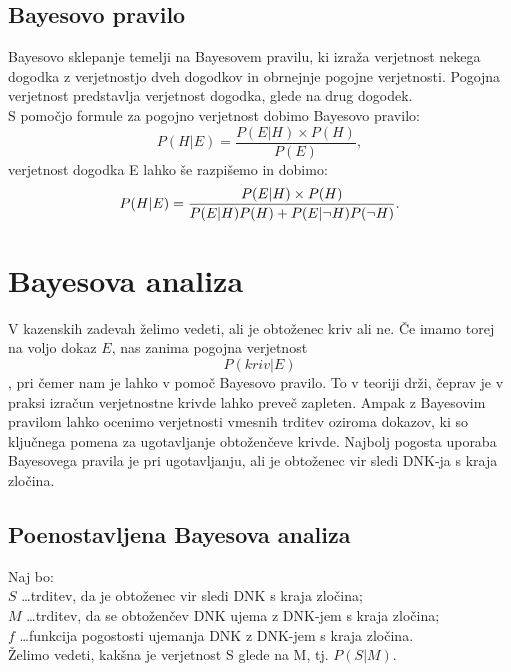\documentclass[12pt,a4paper]{amsart}
\theoremstyle{definition} %
\theoremstyle{plain} %
\begin{document}
\subsection{Bayesovo pravilo} 
Bayesovo sklepanje temelji na Bayesovem pravilu, ki izraža verjetnost nekega dogodka z verjetnostjo dveh dogodkov in obrnejnje pogojne
verjetnosti. Pogojna verjetnost predstavlja verjetnost dogodka, glede na drug dogodek. \\
 
S pomočjo formule za pogojno verjetnost dobimo Bayesovo pravilo:
\begin{equation}\label{eq:bpravilo}
    P(H \lvert E) = \frac{P(E \lvert H) \times P(H)}{P(E)},
\end{equation}
verjetnost dogodka E lahko še razpišemo in dobimo:
\begin{equation}\label{eq:b_pravilo}
    P(H \lvert E) = \frac{P(E \lvert H) \times P(H)}{P(E \lvert H)P(H) + P(E \lvert \neg H)P(\neg H)\vspace{3mm}}.
\end{equation}

\section{Bayesova analiza}
V kazenskih zadevah želimo vedeti, ali je obtoženec kriv ali ne. Če imamo torej na voljo dokaz $E$, nas zanima pogojna verjetnost \vspace{3mm}
\[P(kriv \lvert E)\], pri čemer nam je lahko v pomoč Bayesovo pravilo. To v teoriji drži, čeprav je v praksi izračun verjetnostne krivde lahko
preveč zapleten. Ampak z Bayesovim pravilom lahko ocenimo verjetnosti vmesnih trditev oziroma dokazov, ki so ključnega pomena za ugotavljanje
obtoženčeve krivde. Najbolj pogosta uporaba Bayesovega pravila je pri ugotavljanju, ali je obtoženec vir sledi DNK-ja s kraja zločina. \\

\subsection{Poenostavljena Bayesova analiza}
Naj bo:\\
$S$ \dots trditev, da je obtoženec vir sledi DNK s kraja zločina; \\
$M$ \dots trditev, da se obtoženčev DNK ujema z DNK-jem s kraja zločina; \\
$f$ \dots funkcija pogostosti ujemanja DNK z DNK-jem s kraja zločina. \\
Želimo vedeti, kakšna je verjetnost S glede na M, tj. $P(S \lvert M)$. \\
\end{document}
